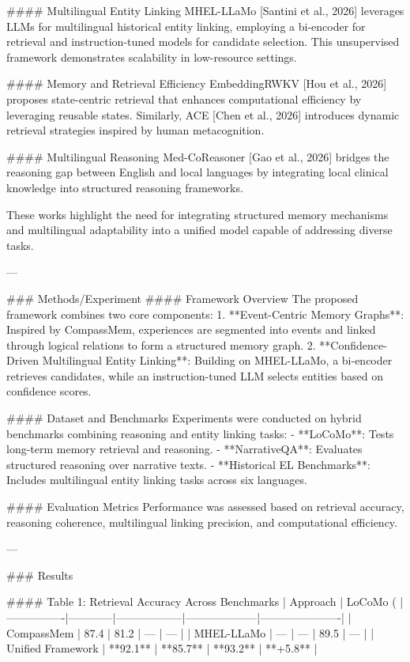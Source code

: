 #### Multilingual Entity Linking  
MHEL-LLaMo [Santini et al., 2026] leverages LLMs for multilingual historical entity linking, employing a bi-encoder for retrieval and instruction-tuned models for candidate selection. This unsupervised framework demonstrates scalability in low-resource settings.  

#### Memory and Retrieval Efficiency  
EmbeddingRWKV [Hou et al., 2026] proposes state-centric retrieval that enhances computational efficiency by leveraging reusable states. Similarly, ACE [Chen et al., 2026] introduces dynamic retrieval strategies inspired by human metacognition.  

#### Multilingual Reasoning  
Med-CoReasoner [Gao et al., 2026] bridges the reasoning gap between English and local languages by integrating local clinical knowledge into structured reasoning frameworks.  

These works highlight the need for integrating structured memory mechanisms and multilingual adaptability into a unified model capable of addressing diverse tasks.  

---

### Methods/Experiment  
#### Framework Overview  
The proposed framework combines two core components:  
1. **Event-Centric Memory Graphs**: Inspired by CompassMem, experiences are segmented into events and linked through logical relations to form a structured memory graph.  
2. **Confidence-Driven Multilingual Entity Linking**: Building on MHEL-LLaMo, a bi-encoder retrieves candidates, while an instruction-tuned LLM selects entities based on confidence scores.  

#### Dataset and Benchmarks  
Experiments were conducted on hybrid benchmarks combining reasoning and entity linking tasks:  
- **LoCoMo**: Tests long-term memory retrieval and reasoning.  
- **NarrativeQA**: Evaluates structured reasoning over narrative texts.  
- **Historical EL Benchmarks**: Includes multilingual entity linking tasks across six languages.  

#### Evaluation Metrics  
Performance was assessed based on retrieval accuracy, reasoning coherence, multilingual linking precision, and computational efficiency.  

---

### Results  

#### Table 1: Retrieval Accuracy Across Benchmarks  
| Approach       | LoCoMo (%
|----------------|------------|------------------|--------------------|----------------------|  
| CompassMem     | 87.4       | 81.2             | ---                | ---                  |  
| MHEL-LLaMo     | ---        | ---              | 89.5               | ---                  |  
| Unified Framework | **92.1** | **85.7**         | **93.2**           | **+5.8**             |  

